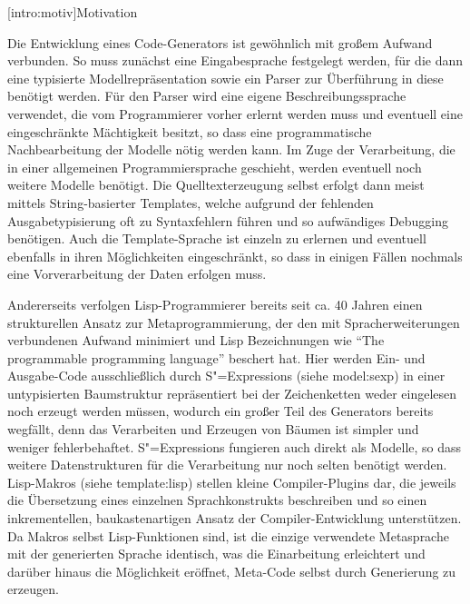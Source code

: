 \documentclass[12pt, a4paper, bibgerm]{scrbook}
\newcommand\lsection{}
\newcommand\sref{}
\newcommand{\sees}[1]{(siehe \sref{#1})}
\newcommand{\sexps}{S"=Expressions}
\newcommand{\mprog}{Metaprogrammierung}
\begin{document}
\lsection[intro:motiv]{Motivation}

Die Entwicklung eines Code-Generators ist gewöhnlich mit großem Aufwand
verbunden. So muss zunächst eine Eingabesprache festgelegt werden, für
die dann eine typisierte Modellrepräsentation sowie ein Parser zur
Überführung in diese benötigt werden. Für den Parser wird eine eigene
Beschreibungssprache verwendet, die vom Programmierer vorher erlernt
werden muss und eventuell eine eingeschränkte Mächtigkeit besitzt, so
dass eine programmatische Nachbearbeitung der Modelle nötig werden
kann. Im Zuge der Verarbeitung, die in einer allgemeinen
Programmiersprache geschieht, werden eventuell noch weitere Modelle
benötigt. Die Quelltexterzeugung selbst erfolgt dann meist mittels
String-basierter Templates, welche aufgrund der fehlenden
Ausgabetypisierung oft zu Syntaxfehlern führen und so aufwändiges
Debugging benötigen. Auch die Template-Sprache ist einzeln zu erlernen
und eventuell ebenfalls in ihren Möglichkeiten eingeschränkt, so dass in
einigen Fällen nochmals eine Vorverarbeitung der Daten erfolgen muss.

Andererseits verfolgen Lisp-Programmierer bereits seit ca. 40
Jahren \cite{EvolutionOfLisp} einen strukturellen Ansatz zur \mprog{}, der den
mit Spracherweiterungen verbundenen Aufwand minimiert und Lisp
Bezeichnungen wie "`The programmable programming
language"' \cite{Federano} beschert hat. Hier werden Ein- und Ausgabe-Code
ausschließlich durch \sexps{} \sees{model:sexp} in einer untypisierten
Baumstruktur repräsentiert bei der Zeichenketten weder eingelesen noch
erzeugt werden müssen, wodurch ein großer Teil des Generators bereits
wegfällt, denn das Verarbeiten und Erzeugen von Bäumen ist simpler und
weniger fehlerbehaftet. \sexps{} fungieren auch direkt als Modelle, so
dass weitere Datenstrukturen für die Verarbeitung nur noch selten
benötigt werden. Lisp-Makros \sees{template:lisp} stellen kleine
Compiler-Plugins dar, die jeweils die Übersetzung eines einzelnen
Sprachkonstrukts beschreiben und so einen inkrementellen,
baukastenartigen Ansatz der Compiler-Entwicklung unterstützen. Da Makros
selbst Lisp-Funktionen sind, ist die einzige verwendete Metasprache mit
der generierten Sprache identisch, was die Einarbeitung erleichtert und
darüber hinaus die Möglichkeit eröffnet, Meta-Code selbst durch
Generierung zu erzeugen.
\end{document}

